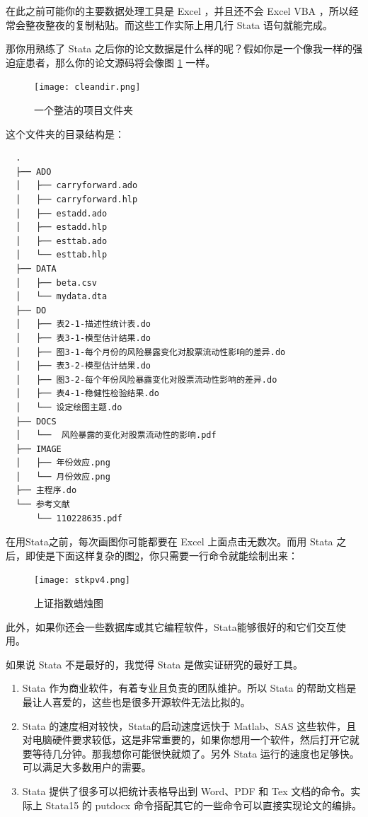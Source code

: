 \documentclass[cn,fancy,blue,11pt]{elegantbook}
\begin{document}
在此之前可能你的主要数据处理工具是 Excel ，并且还不会 Excel VBA ，所以经常会整夜整夜的复制粘贴。而这些工作实际上用几行 Stata 语句就能完成。

那你用熟练了 Stata 之后你的论文数据是什么样的呢？假如你是一个像我一样的强迫症患者，那么你的论文源码将会像图 \ref{fig:cleandir} 一样。

\begin{figure}[htbp]
  \centering \texttt{[image: cleandir.png]}
  \caption{一个整洁的项目文件夹}
  \label{fig:cleandir}
\end{figure}

这个文件夹的目录结构是：

\begin{lstlisting}
  .
  ├── ADO
  │   ├── carryforward.ado
  │   ├── carryforward.hlp
  │   ├── estadd.ado
  │   ├── estadd.hlp
  │   ├── esttab.ado
  │   └── esttab.hlp
  ├── DATA
  │   ├── beta.csv
  │   └── mydata.dta
  ├── DO
  │   ├── 表2-1-描述性统计表.do
  │   ├── 表3-1-模型估计结果.do
  │   ├── 图3-1-每个月份的风险暴露变化对股票流动性影响的差异.do
  │   ├── 表3-2-模型估计结果.do
  │   ├── 图3-2-每个年份风险暴露变化对股票流动性影响的差异.do
  │   ├── 表4-1-稳健性检验结果.do
  │   └── 设定绘图主题.do
  ├── DOCS
  │   └──  风险暴露的变化对股票流动性的影响.pdf
  ├── IMAGE
  │   ├── 年份效应.png
  │   └── 月份效应.png
  ├── 主程序.do
  └── 参考文献
      └── 110228635.pdf
\end{lstlisting}

在用Stata之前，每次画图你可能都要在 Excel 上面点击无数次。而用 Stata 之后，即使是下面这样复杂的图\ref{fig:sci}，你只需要一行命令就能绘制出来：

\begin{figure}[htbp]
  \centering \texttt{[image: stkpv4.png]}
  \caption{上证指数蜡烛图}
  \label{fig:sci}
\end{figure}

此外，如果你还会一些数据库或其它编程软件，Stata能够很好的和它们交互使用。

如果说 Stata 不是最好的，我觉得 Stata 是做实证研究的最好工具。

\begin{enumerate}
  \item  Stata 作为商业软件，有着专业且负责的团队维护。所以 Stata 的帮助文档是最让人喜爱的，这些也是很多开源软件无法比拟的。
  \item  Stata 的速度相对较快，Stata的启动速度远快于 Matlab、SAS 这些软件，且对电脑硬件要求较低，这是非常重要的，如果你想用一个软件，然后打开它就要等待几分钟。那我想你可能很快就烦了。另外 Stata 运行的速度也足够快。可以满足大多数用户的需要。
  \item  Stata 提供了很多可以把统计表格导出到 Word、PDF 和 Tex 文档的命令。实际上 Stata15 的 putdocx 命令搭配其它的一些命令可以直接实现论文的编排。
\end{enumerate}
\end{document}
